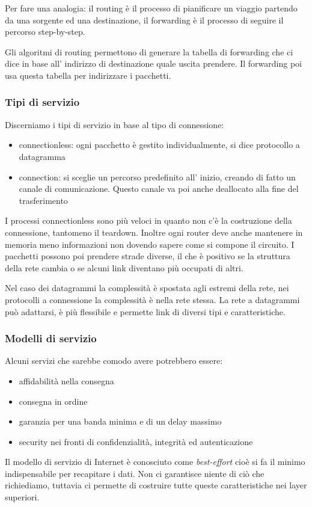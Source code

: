 Per fare una analogia: il routing è il processo di pianificare un viaggio partendo da una sorgente ed una destinazione, il forwarding è il processo di seguire il percorso step-by-step.

Gli algoritmi di routing permettono di generare la tabella di forwarding che ci dice in base all' indirizzo di destinazione quale uscita prendere.
Il forwarding poi usa questa tabella per indirizzare i pacchetti.

\subsubsection{Tipi di servizio}
Discerniamo i tipi di servizio in base al tipo di connessione:
\begin{itemize}
    \item connectionless: ogni pacchetto è gestito individualmente, si dice protocollo a datagramma
    \item connection: si sceglie un percorso predefinito all' inizio, creando di fatto un canale di comunicazione. Questo canale va poi anche deallocato alla fine del trasferimento 
\end{itemize}

I processi connectionless sono più veloci in quanto non c'è la costruzione della connessione, tantomeno il teardown.
Inoltre ogni router deve anche mantenere in memoria meno informazioni non dovendo sapere come si compone il circuito.
I pacchetti possono poi prendere strade diverse, il che è positivo se la struttura della rete cambia o se alcuni link diventano più occupati di altri.

Nel caso dei datagrammi la complessità è spostata agli estremi della rete, nei protocolli a connessione la complessità è nella rete stessa.
La rete a datagrammi può adattarsi, è più flessibile e permette link di diversi tipi e caratteristiche.

\subsubsection{Modelli di servizio}
Alcuni servizi che sarebbe comodo avere potrebbero essere:
\begin{itemize}
    \item affidabilità nella consegna
    \item consegna in ordine
    \item garanzia per una banda minima e di un delay massimo
    \item security nei fronti di confidenzialità, integrità ed autenticazione
\end{itemize}
Il modello di servizio di Internet è conosciuto come \emph{best-effort} cioè si fa il minimo indispensabile per recapitare i dati.
Non ci garantisce niente di ciò che richiediamo, tuttavia ci permette di costruire tutte queste caratteristiche nei layer superiori.


